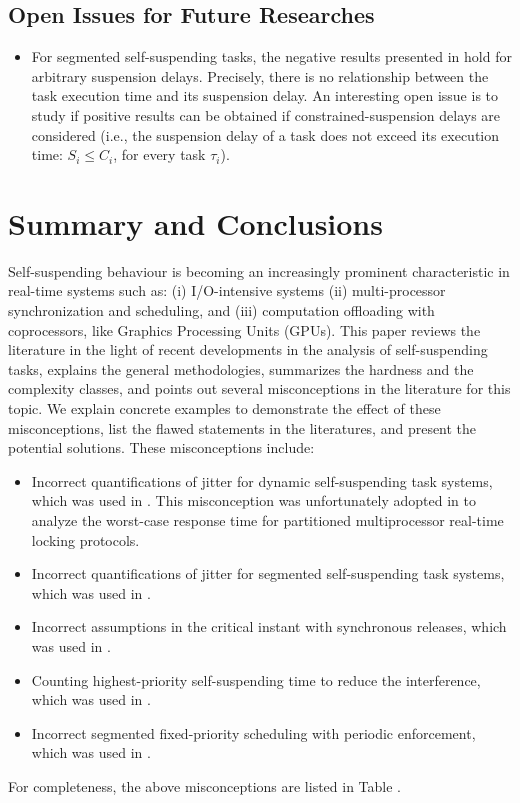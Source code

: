 \subsection{Open Issues for Future Researches}
\label{sec:open-issues-future}

\begin{itemize}

\item For segmented self-suspending tasks, the negative results presented in \cite{Ridouard_2004} hold for arbitrary suspension delays. Precisely, there is no relationship between the task execution time and its suspension delay. An interesting open issue is to study if positive results can be obtained if constrained-suspension delays are considered (i.e., the suspension delay of a task does not exceed its execution time: $S_i \leq C_i$, for every task $\tau_i$).
\end{itemize}

\section{Summary and Conclusions}
  
 Self-suspending behaviour is becoming an increasingly prominent
characteristic in real-time systems such as: (i) I/O-intensive systems
(ii) multi-processor synchronization and scheduling, and (iii)
computation offloading with coprocessors, like Graphics Processing
Units (GPUs).  This paper reviews the literature in the light of
recent developments in the analysis of self-suspending tasks,
explains the general methodologies, summarizes the hardness and
the complexity classes, and points out several 
misconceptions in the literature for this topic. We
explain concrete examples to demonstrate the effect of these
misconceptions, list the flawed statements in the literatures, and
present the potential solutions. These misconceptions include:
\begin{itemize}
\item Incorrect quantifications of jitter for dynamic self-suspending
  task systems, which was used in
  \cite{ECRTS-AudsleyB04,RTAS-AudsleyB04,RTCSA-KimCPKH95}.  This
  misconception was unfortunately adopted in
  \cite{zeng-2011,bbb-2013,yang-2013,kim-2014,han-2014,carminati-2014,yang-2014,lakshmanan-2009} to analyze the worst-case response time for
  partitioned multiprocessor real-time locking protocols.
\item Incorrect quantifications of jitter for segmented self-suspending
  task systems, which was used in  \cite{RTCSA-BletsasA05}.
\item Incorrect assumptions in the critical instant with
  synchronous releases, which was used in \cite{LR:rtas10}.
\item Counting highest-priority self-suspending time to reduce the
  interference, which was used in  \cite{RTSS-KimANR13}. 
\item Incorrect segmented fixed-priority scheduling with periodic
  enforcement, which was used in \cite{RTSS-KimANR13,DBLP:journals/ieicet/DingTT09}.
\end{itemize}
For completeness, the above misconceptions are listed in Table .

